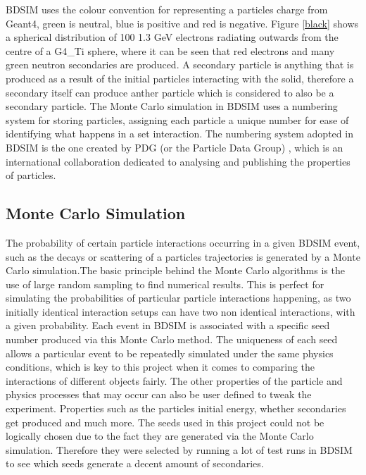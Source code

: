 \documentclass[12pt,a4paper]{article}
\begin{document}
\noindent BDSIM uses the colour convention for representing a particles charge from Geant4, green is neutral, blue is positive and red is negative. Figure \ref{black} shows a spherical distribution of 100 1.3 GeV electrons radiating outwards from the centre of a G4\_Ti sphere, where it can be seen that red electrons and many green neutron secondaries are produced. A secondary particle is anything that is produced as a result of the initial particles interacting with the solid, therefore a secondary itself can produce anther particle which is considered to also be  a secondary particle. The Monte Carlo simulation in BDSIM uses a numbering system for storing particles, assigning each particle a unique number for ease of identifying what happens in a set interaction. The numbering system adopted in BDSIM is the one created by PDG (or the Particle Data Group) \cite{pdg}, which is an international collaboration dedicated to analysing and publishing the properties of particles. 

\subsection{Monte Carlo Simulation}
\label{monte}
\noindent The probability of certain particle interactions occurring in a given BDSIM event, such as the decays or scattering of a particles trajectories is generated by a Monte Carlo simulation.The basic principle behind the Monte Carlo algorithms is the use of large random sampling to find numerical results. This is perfect for simulating the probabilities of particular particle interactions happening, as two initially identical interaction setups can have two non identical interactions, with a given probability. Each event in BDSIM is associated with a specific seed number produced via this Monte Carlo method. The uniqueness of each seed allows a particular event to be repeatedly simulated under the same physics conditions, which is key to this project when it comes to comparing the interactions of different objects fairly. The other properties of the particle and physics processes that may occur can also be user defined to tweak the experiment. Properties such as the particles initial energy, whether secondaries get produced and much more. The seeds used in this project could not be logically chosen due to the fact they are generated via the Monte Carlo simulation. Therefore they were selected by running a lot of test runs in BDSIM to see which seeds generate a decent amount of secondaries.
\end{document}
